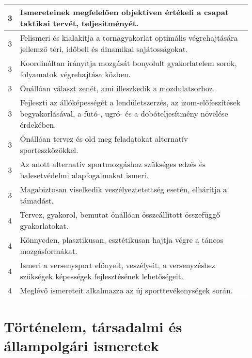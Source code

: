 \begin{longtable}{c | p{12cm} }
                                
                                          3 &  Ismereteinek megfelelően objektíven értékeli a csapat taktikai tervét, teljesítményét. \\ \hline
                                          3 &  Felismeri és kialakítja a tornagyakorlat optimális végrehajtására jellemző téri, időbeli és dinamikai sajátosságokat. \\ \hline
                                          3 &  Koordináltan irányítja mozgását bonyolult gyakorlatelem sorok, folyamatok végrehajtása közben. \\ \hline
                                          3 &  Önállóan választ zenét, ami illeszkedik a mozdulatsorhoz. \\ \hline
                                          3 &  Fejleszti az állóképességét a lendületszerzés, az izom-előfeszítések begyakorlásával, a futó-, ugró- és a dobóteljesítmény növelése érdekében. \\ \hline
                                          3 &  Önállóan tervez  és old meg feladatokat alternatív sporteszközökkel. \\ \hline
                                          3 &  Az adott alternatív sportmozgáshoz szükséges edzés és balesetvédelmi alapfogalmakat ismeri. \\ \hline
                                          3 &  Magabiztosan viselkedik veszélyeztetettség esetén, elhárítja a támadást. \\ \hline
                                      
                                
                                          4 &  Tervez, gyakorol, bemutat önállóan összeállított összefüggő gyakorlatokat. \\ \hline
                                          4 &  Könnyeden, plasztikusan, esztétikusan hajtja végre a táncos mozgásformákat. \\ \hline
                                          4 &  Ismeri a versenysport előnyeit, veszélyeit, a versenyzéshez szükségek képességek fejlesztésének lehetőségeit. \\ \hline
                                          4 &  Meglévő ismereteit alkalmazza az új sporttevékenységek során. \\ \hline
                                      
                        \end{longtable}
            \clearpage

        \section{Történelem, társadalmi és állampolgári ismeretek}

